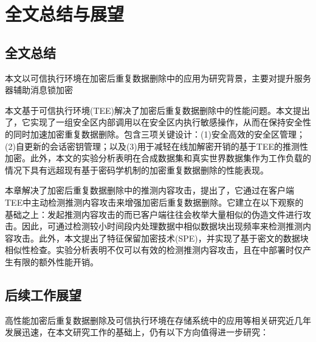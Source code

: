 \chapter{全文总结与展望}

\section{全文总结}

本文以可信执行环境在加密后重复数据删除中的应用为研究背景，主要对提升服务器辅助消息锁加密

本文基于可信执行环境(TEE)解决了加密后重复数据删除中的性能问题。本文提出了\sysnameS，它实现了一组安全区内部调用以在安全区内执行敏感操作，从而在保持安全性的同时加速加密重复数据删除。\sysnameS 包含三项关键设计：(1)安全高效的安全区管理；(2)自更新的会话密钥管理；以及(3)用于减轻在线加解密开销的基于TEE的推测性加密。此外，本文的实验分析表明\sysnameS 在合成数据集和真实世界数据集作为工作负载的情况下具有远超现有基于密码学机制的加密重复数据删除的性能表现。

本章解决了加密后重复数据删除中的推测内容攻击，提出了\sysnameF，它通过在客户端TEE中主动检测推测内容攻击来增强加密后重复数据删除。它建立在以下观察的基础之上：发起推测内容攻击的而已客户端往往会枚举大量相似的伪造文件进行攻击。因此，可通过检测较小时间段内处理数据中相似数据块出现频率来检测推测内容攻击。此外，本文提出了特征保留加密技术(SPE)，并实现了基于密文的数据块相似性检查。实验分析表明\sysnameF 不仅可以有效的检测推测内容攻击，且在\sysnameS 中部署时仅产生有限的额外性能开销。


\section{后续工作展望}

高性能加密后重复数据删除及可信执行环境在存储系统中的应用等相关研究近几年发展迅速，在本文研究工作的基础上，仍有以下方向值得进一步研究：
